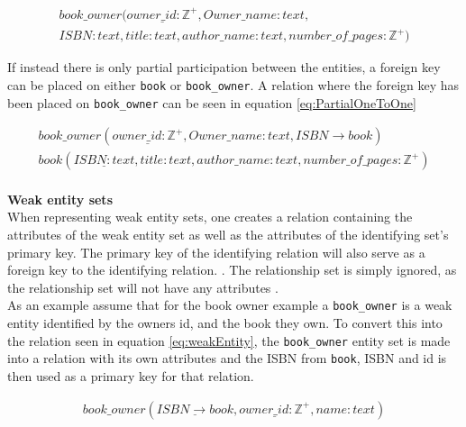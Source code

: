 \begin{equation}\label{eq:TotalOneToOne}
    \begin{split}
        book\_owner(\underline{owner\_id : \mathbb{Z}^+} , Owner\_name : text , \\
        ISBN : text , title : text , author\_name : text , number\_of\_pages : \mathbb{Z}^+
        )
    \end{split}
\end{equation}

If instead there is only partial participation between the entities, a foreign key can be placed on either \texttt{book} or \texttt{book\_owner}. A relation where the foreign key has been placed on \texttt{book\_owner} can be seen in equation \ref{eq:PartialOneToOne}

\begin{equation}\label{eq:PartialOneToOne}
    \begin{split}
        book\_owner(\underline{owner\_id : \mathbb{Z}^+} , Owner\_name : text, ISBN \rightarrow book) \\
        book(\underline{ISBN : text} , title : text , author\_name : text , number\_of\_pages : \mathbb{Z}^+
        )
    \end{split}
\end{equation}
\\
\textbf{Weak entity sets}\\
When representing weak entity sets, one creates a relation containing the attributes of the weak entity set as well as the attributes of the identifying set's primary key.
The primary key of the identifying relation will also serve as a foreign key to the identifying relation. \cite{DBSBook}.
The relationship set is simply ignored, as the relationship set will not have any attributes \cite{DBSBook}.\\
As an example assume that for the book owner example a \texttt{book\_owner} is a weak entity identified by the owners id, and the book they own. To convert this into the relation seen in equation \ref*{eq:weakEntity}, the \texttt{book\_owner} entity set is made into a relation with its own attributes and the ISBN from \texttt{book}, ISBN and id is then used as a primary key for that relation. 

\begin{equation}\label{eq:weakEntity}
    \begin{split}
        book\_owner(\underline{ISBN \rightarrow book} , \underline{owner\_id:\mathbb{Z}^+} , name : text)
    \end{split}
\end{equation}

